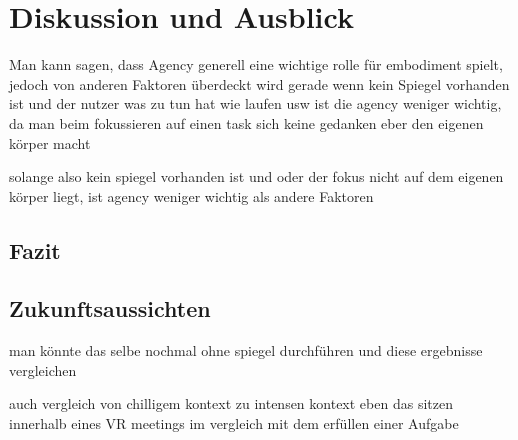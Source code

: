 \chapter{Diskussion und Ausblick}

Man kann sagen, dass Agency generell eine wichtige rolle für embodiment spielt, jedoch von anderen Faktoren überdeckt wird
gerade wenn kein Spiegel vorhanden ist und der nutzer was zu tun hat wie laufen usw ist die agency weniger wichtig, da man beim fokussieren auf einen task sich keine gedanken eber den eigenen körper macht

solange also kein spiegel vorhanden ist und oder der fokus nicht auf dem eigenen körper liegt, ist agency weniger wichtig als andere Faktoren

\section{Fazit}

\section{Zukunftsaussichten}


man könnte das selbe nochmal ohne spiegel durchführen und diese ergebnisse vergleichen

auch vergleich von chilligem kontext zu intensen kontext
eben das sitzen innerhalb eines VR meetings im vergleich mit dem erfüllen einer Aufgabe
